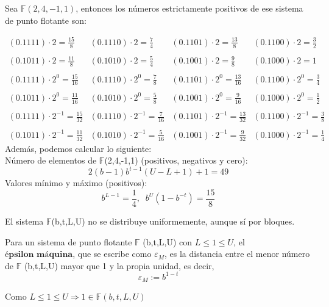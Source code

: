 \begin{ejemplo}
Sea $\mathbb{F} (2,4,-1,1)$, entonces los números estrictamente positivos de ese sistema de punto flotante son:

\[ \begin{array}{llll}
(0.1111) \cdot 2 = \frac{15}{8} & (0.1110) \cdot 2 = \frac{7}{4} & (0.1101) \cdot 2 = \frac{13}{8} & (0.1100) \cdot 2 = \frac{3}{2} \\
\\ (0.1011) \cdot 2 = \frac{11}{8} & (0.1010) \cdot 2 = \frac{5}{4} & (0.1001) \cdot 2 = \frac{9}{8} & (0.1000) \cdot 2 = 1 \\
\\ (0.1111) \cdot 2^0 = \frac{15}{16} & (0.1110) \cdot 2^0 = \frac{7}{8} & (0.1101) \cdot 2^0 = \frac{13}{16} & (0.1100) \cdot 2^0 = \frac{3}{4}\\
\\ (0.1011) \cdot 2^0 = \frac{11}{16} & (0.1010) \cdot 2^0 = \frac{5}{8} & (0.1001) \cdot 2^0 = \frac{9}{16} & (0.1000) \cdot 2^0 = \frac{1}{2}\\
\\ (0.1111) \cdot 2^{-1} = \frac{15}{32} & (0.1110) \cdot 2^{-1} = \frac{7}{16} & (0.1101) \cdot 2^{-1} = \frac{13}{32} & (0.1100) \cdot 2^{-1} = \frac{3}{8}\\
\\ (0.1011) \cdot 2^{-1} = \frac{11}{32} & (0.1010) \cdot 2^{-1} = \frac{5}{16} & (0.1001) \cdot 2^{-1} = \frac{9}{32} & (0.1000) \cdot 2^{-1} = \frac{1}{4}
\end{array} \]
Además, podemos calcular lo siguiente:\\
Número de elementos de $\mathbb{F}$(2,4,-1,1) (positivos, negativos y cero):
\[ 2(b-1)b^{t-1}(U-L+1) + 1 = 49 \]
Valores mínimo y máximo (positivos):
\[ b^{L-1} = \frac{1}{4}, \; \; b^U(1-b^{-t}) = \frac{15}{8} \]
\end{ejemplo}

El sistema $\mathbb{F}$(b,t,L,U) no se distribuye uniformemente, aunque sí por bloques.

\begin{ndef}
Para un sistema de punto flotante $\mathbb{F}$ (b,t,L,U) con $L \leq 1 \leq U$, el $\textbf{épsilon máquina}$, que se escribe como $\varepsilon _M$, es la distancia entre el menor número de $\mathbb{F}$ (b,t,L,U) mayor que 1 y la propia unidad, es decir,
\[ \varepsilon _M := b^{1-t} \]
\end{ndef}

Como $L \leq 1 \leq U \Rightarrow 1 \in \mathbb{F} (b,t,L,U)$

